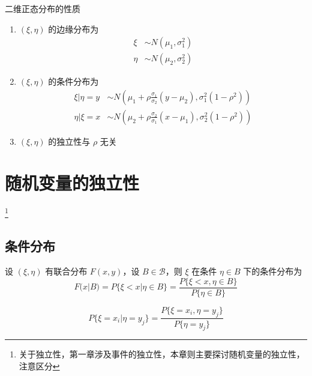 \documentclass[12pt,a4paper]{amsart}
\begin{document}
\begin{proposition}
    二维正态分布的性质
    \begin{enumerate}
        \item $(\xi, \eta)$ 的边缘分布为
        \begin{equation}
            \begin{aligned}
                \xi &\sim N(\mu_1, \sigma_1^2) \\
                \eta &\sim N(\mu_2, \sigma_2^2)
            \end{aligned}
        \end{equation}
        \item $(\xi, \eta)$ 的条件分布为
        \begin{equation}
            \begin{aligned}
                \xi|\eta = y &\sim N\left(\mu_1+\rho\frac{\sigma_1}{\sigma_2}(y-\mu_2), \sigma_1^2(1-\rho^2)\right) \\
                \eta|\xi = x &\sim N\left(\mu_2+\rho\frac{\sigma_2}{\sigma_1}(x-\mu_1), \sigma_2^2(1-\rho^2)\right)
            \end{aligned}
        \end{equation}
        \item $(\xi, \eta)$ 的独立性与 $\rho$ 无关
    \end{enumerate}
\end{proposition}

\section{随机变量的独立性}\footnote{关于独立性，第一章涉及事件的独立性，本章则主要探讨随机变量的独立性，注意区分}

\subsection{条件分布}

\begin{definition}[条件分布]
    设 $(\xi, \eta)$ 有联合分布 $F(x, y)$，设 $B\in \mathcal{B}$，则 $\xi$ 在条件 $\eta\in B$ 下的条件分布为
    \begin{equation}
        F(x|B) = P\{\xi < x|\eta\in B\} = \frac{P\{\xi < x, \eta\in B\}}{P\{\eta\in B\}}
    \end{equation}
\end{definition}

\begin{definition}[离散型条件分布]
    \begin{equation}
        P\{\xi=x_i|\eta=y_j\} = \frac{P\{\xi=x_i, \eta=y_j\}}{P\{\eta=y_j\}}
    \end{equation}
\end{definition}
\end{document}
